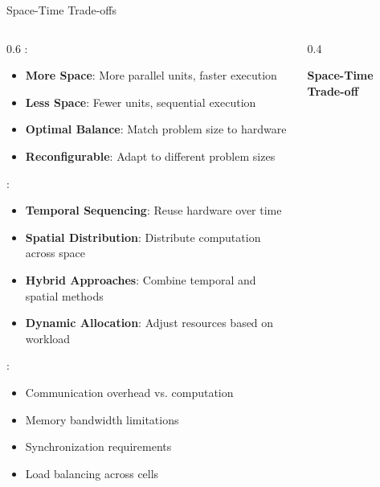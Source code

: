 \begin{frame}{Space-Time Trade-offs}
\begin{columns}
\begin{column}{0.6\textwidth}
:
\begin{itemize}
\item \textbf{More Space}: More parallel units, faster execution
\item \textbf{Less Space}: Fewer units, sequential execution
\item \textbf{Optimal Balance}: Match problem size to hardware
\item \textbf{Reconfigurable}: Adapt to different problem sizes
\end{itemize}

\vspace{0.3cm}
:
\begin{itemize}
\item \textbf{Temporal Sequencing}: Reuse hardware over time
\item \textbf{Spatial Distribution}: Distribute computation across space
\item \textbf{Hybrid Approaches}: Combine temporal and spatial methods
\item \textbf{Dynamic Allocation}: Adjust resources based on workload
\end{itemize}

\vspace{0.3cm}
:
\begin{itemize}
\item Communication overhead vs. computation
\item Memory bandwidth limitations
\item Synchronization requirements
\item Load balancing across cells
\end{itemize}
\end{column}
\begin{column}{0.4\textwidth}
\begin{center}
\textbf{Space-Time Trade-off}
\vspace{0.3cm}

\end{center}
\end{column}
\end{columns}
\end{frame}

